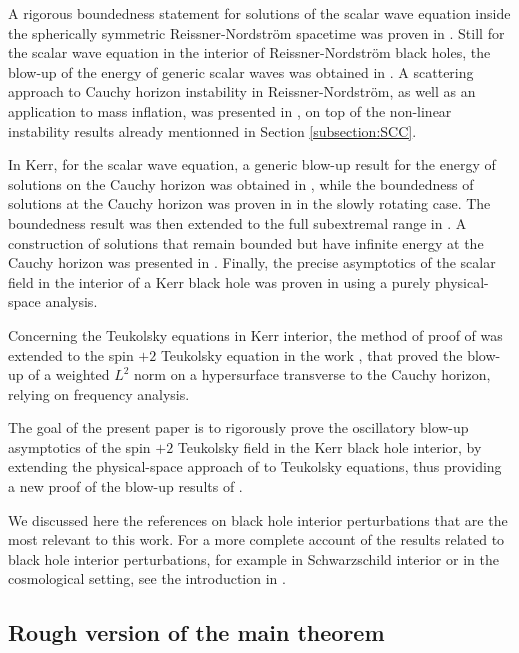 \documentclass[reqno]{amsart}
\numberwithin{equation}{section}
\theoremstyle{plain}
\theoremstyle{definition}
\theoremstyle{remark}
\numberwithin{equation}{section}
\begin{document}
A rigorous boundedness statement for solutions of the scalar wave equation inside the spherically symmetric Reissner-Nordström spacetime was proven in \cite{franzen}. Still for the scalar wave equation in the interior of Reissner-Nordström black holes, the blow-up of the energy of generic scalar waves was obtained in \cite{RNscalar}.  A scattering approach to Cauchy horizon instability in Reissner-Nordström, as well as an application to mass inflation, was presented in \cite{lukk}, on top of the non-linear instability results \cite{RNNLI,RNNLII,dafscc,vdmmmm,vdminsta} already mentionned in Section \ref{subsection:SCC}.

In Kerr, for the scalar wave equation, a generic blow-up result for the energy of solutions on the Cauchy horizon was obtained in \cite{kerrwave}, while the boundedness of solutions at the Cauchy horizon was proven in \cite{hintzkerrwave} in the slowly rotating case. The boundedness result was then extended to the full subextremal range in \cite{franzen2}. A construction of solutions that remain bounded but have infinite energy at the Cauchy horizon was presented in \cite{daf3}. Finally, the precise asymptotics of the scalar field in the interior of a Kerr black hole was proven in \cite{scalarMZ} using a purely physical-space analysis.

Concerning the Teukolsky equations in Kerr interior, the method of proof of \cite{kerrwave} was extended to the spin $+2$ Teukolsky equation in the work \cite{sbierski}, that proved the blow-up of a weighted $L^2$ norm on a hypersurface transverse to the Cauchy horizon, relying on frequency analysis. 
 
The goal of the present paper is to rigorously prove the oscillatory blow-up asymptotics of the spin $+2$ Teukolsky field in the Kerr black hole interior, by extending the physical-space approach of \cite{scalarMZ} to Teukolsky equations, thus providing a new proof of the blow-up results of \cite{sbierski}.

We discussed here the references on black hole interior perturbations that are the most relevant to this work. For a more complete account of the results related to black hole interior perturbations, for example in Schwarzschild interior or in the cosmological setting, see the introduction in \cite{sbierski}.


\subsection{Rough version of the main theorem}\label{section:mainthm}
\end{document}
